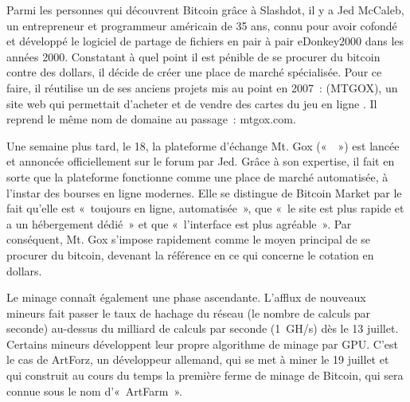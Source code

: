 Parmi les personnes qui découvrent Bitcoin grâce à Slashdot, il y a Jed McCaleb, un entrepreneur et programmeur américain de 35 ans, connu pour avoir cofondé et développé le logiciel de partage de fichiers en pair à pair eDonkey2000 dans les années 2000. Constatant à quel point il est pénible de se procurer du bitcoin contre des dollars, il décide de créer une place de marché spécialisée. Pour ce faire, il réutilise un de ses anciens projets mis au point en 2007~:  (MTGOX), un site web qui permettait d'acheter et de vendre des cartes du jeu en ligne . Il reprend le même nom de domaine au passage~: mtgox.com.

Une semaine plus tard, le 18, la plateforme d'échange Mt. Gox («~~») est lancée et annoncée officiellement sur le forum par Jed. Grâce à son expertise, il fait en sorte que la plateforme fonctionne comme une place de marché automatisée, à l'instar des bourses en ligne modernes. Elle se distingue de Bitcoin Market par le fait qu'elle est «~toujours en ligne, automatisée~», que «~le site est plus rapide et a un hébergement dédié~» et que «~l'interface est plus agréable~». Par conséquent, Mt. Gox s'impose rapidement comme le moyen principal de se procurer du bitcoin, devenant la référence en ce qui concerne le cotation en dollars.

Le minage connaît également une phase ascendante. L'afflux de nouveaux mineurs fait passer le taux de hachage du réseau (le nombre de calculs par seconde) au-dessus du milliard de calculs par seconde (1~GH/s) dès le 13 juillet. Certains mineurs développent leur propre algorithme de minage par GPU. C'est le cas de ArtForz, un développeur allemand, qui se met à miner le 19 juillet et qui construit au cours du temps la première ferme de minage de Bitcoin, qui sera connue sous le nom d'«~ArtFarm~».

